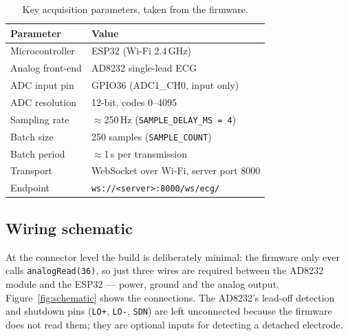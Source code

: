 \begin{table}[h]
  \centering
  \small
  \begin{tabular}{@{}ll@{}}
    \toprule
    \textbf{Parameter} & \textbf{Value} \\
    \midrule
    Microcontroller        & ESP32 (Wi-Fi 2.4\,GHz) \\
    Analog front-end       & AD8232 single-lead ECG \\
    ADC input pin          & GPIO36 (ADC1\_CH0, input only) \\
    ADC resolution         & 12-bit, codes 0--4095 \\
    Sampling rate          & $\approx$250\,Hz (\texttt{SAMPLE\_DELAY\_MS = 4}) \\
    Batch size             & 250 samples (\texttt{SAMPLE\_COUNT}) \\
    Batch period           & $\approx$1\,s per transmission \\
    Transport              & WebSocket over Wi-Fi, server port 8000 \\
    Endpoint               & \texttt{ws://<server>:8000/ws/ecg/} \\
    \bottomrule
  \end{tabular}
  \caption{Key acquisition parameters, taken from the firmware.}
  \label{tab:hwparams}
\end{table}

\subsection{Wiring schematic}
At the connector level the build is deliberately minimal: the firmware only ever
calls \texttt{analogRead(36)}, so just three wires are required between the AD8232
module and the ESP32 --- power, ground and the analog output.
Figure~\ref{fig:schematic} shows the connections. The AD8232's lead-off detection
and shutdown pins (\texttt{LO+}, \texttt{LO-}, \texttt{SDN}) are left unconnected
because the firmware does not read them; they are optional inputs for detecting a
detached electrode.

